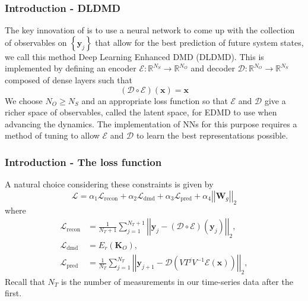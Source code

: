 \documentclass[11pt,aspectratio=169]{beamer}
\newcommand{\norm}[1]{\left|\left|#1\right|\right|}
\newcommand{\parens}[1]{\left(#1\right)}
\newcommand{\bracks}[1]{\left\{#1\right\}}
\newcommand{\R}{\mathbb{R}}
\begin{document}
    \begin{frame}
        \frametitle{Introduction - DLDMD}
        The key innovation of 
        \cite{lago} is to use a neural network to come up with the collection of 
        observables on $\bracks{\boldsymbol{y}_j}$ that allow for the best prediction 
        of future system states, we call this method Deep Learning Enhanced DMD (DLDMD). 
        This is implemented by defining an encoder 
        $\mathcal{E}: \R^{N_S} \to \R^{N_O}$ and decoder $\mathcal{D}: \R^{N_O} \to \R^{N_S}$ composed of 
        dense layers such that 
        \begin{equation}
            (\mathcal{D}\circ\mathcal{E})(\boldsymbol{x}) = \boldsymbol{x}
        \end{equation}
        We choose $N_O \geq N_S$ and an appropriate loss function so that 
        $\mathcal{E}$ and $\mathcal{D}$ give a richer space of observables, called the 
        latent space, for EDMD to use when advancing the dynamics. The implementation 
        of NNs for this purpose requires a method of tuning to allow $\mathcal{E}$ and 
        $\mathcal{D}$ to learn the best representations possible. 
    \end{frame}
    
    \begin{frame}
        \frametitle{Introduction - The loss function}
        A natural choice
        considering these constraints is given by
        \begin{equation}
            \mathcal{L} = \alpha_1 \mathcal{L}_{\text{recon}} + \alpha_2 \mathcal{L}
            _{\text{dmd}} + \alpha_3 \mathcal{L}_{\text{pred}} +\alpha_4 
            \norm{\boldsymbol{W}_g}_2 \label{eqn:loss function} 
        \end{equation}
        where 
        \begin{align}
            \mathcal{L}_{\text{recon}} &= \frac{1}{N_T + 1}\sum_{j=1}^{N_T+1}\norm{\boldsymbol{y}_j - 
            (\mathcal{D}\circ\mathcal{E})(\boldsymbol{y}_j)}_2, \\
            \mathcal{L}_{\text{dmd}} &= E_r(\boldsymbol{K}_O), \\
            \mathcal{L}_{\text{pred}} &= \frac{1}{N_T}\sum_{j=1}^{N_T}\norm{\boldsymbol{y}_{j+1} - 
            \mathcal{D}\parens{VT^j V^{-1}\mathcal{E}(\boldsymbol{x})}}_2, \label{eqn:blah}
        \end{align}
        Recall that $N_T$ is the number of measurements in our time-series data after the first.
    \end{frame}
\end{document}
